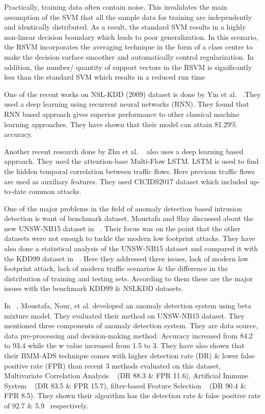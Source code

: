 \documentclass[14pt, conference]{IEEEtran}
\begin{document}
Practically, training data often contain noise. This invalidates the main assumption of the SVM that all the sample data for training are independently and identically distributed. As a result, the standard SVM results in a highly non-linear decision boundary which leads to poor generalization.
In this scenario, the RSVM incorporates the averaging technique in the form of a class centre to make the decision surface smoother and automatically control regularization. In addition, the number/ quantity of support vectors in the RSVM is significantly less than the standard SVM which results in a reduced run time

One of the recent works on NSL-KDD (2009) dataset is done by Yin et al. ~\cite{yin2017deep}.They used a deep learning using recurrent neural networks (RNN). They found that RNN based approach gives superior performance to other classical machine learning approaches.
They have shown that their model can attain 81.29\% accuracy.

Another recent research done by Zhu et al. ~\cite{zhu2018deep} also uses a deep learning based approach. They used the attention-base Multi-Flow LSTM. LSTM is used to find the hidden temporal correlation between traffic flows. Here previous traffic flows are used as auxiliary features. They used CICIDS2017 dataset which included up-to-date common attacks.

One of the major problems in the field of anomaly detection based intrusion detection is want of benchmark dataset. Moustafa and Slay discussed about the new UNSW-NB15 dataset in ~\cite{moustafa2015unsw}. Their focus was on the point that the other datasets were not enough to tackle the modern low footprint attacks. They have also done a statistical analysis of the UNSW-NB15 dataset and compared it with the KDD99 dataset in ~\cite{moustafa2016evaluation}. Here they addressed three issues, lack of modern low footprint attack, lack of modern traffic scenarios \& the difference in the distribution of training and testing sets. According to them these are the major issues with the benchmark KDD99 \& NSLKDD datasets.

In ~\cite{moustafa2018anomaly}, Moustafa, Nour, et al. developed an anomaly detection system using beta mixture model. They evaluated their method on UNSW-NB15 dataset. They mentioned three components of anomaly detection system. They are data source, data pre-processing and decision-making method. Accuracy increased from 84.2 to 93.4 while the w value increased from 1.5 to 3. They have also shown that their BMM-ADS technique comes with higher detection rate (DR) \& lower false positive rate (FPR) than recent 3 methods evaluated on this dataset, Multivariate Correlation Analysis ~\cite{tan2014system} (DR 88.3 \& FPR 11.6), Artificial Immune System ~\cite{saurabh2016efficient} (DR 83.5 \& FPR 15.7), filter-based Feature Selection ~\cite{ambusaidi2016building} (DR 90.4 \& FPR 8.5). They shown their algorithm has the detection rate \& false positive rate of 92.7 \& 5.9~\cite{moustafa2018anomaly} respectively.
\end{document}
